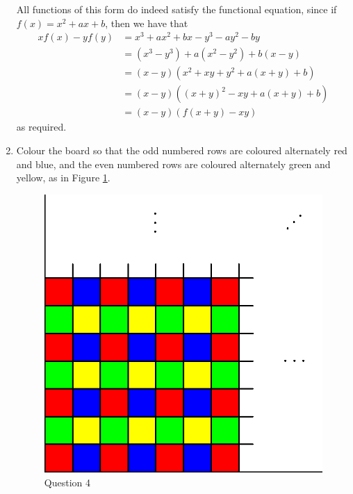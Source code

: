 \documentclass[12pt]{article}
\begin{document}
\begin{enumerate}
All functions of this form do indeed satisfy the functional equation, since if
$f(x) = x^2 + ax + b$, then we have that
\begin{align*}
    xf(x) - yf(y) & = x^3 + ax^2 + bx - y^3 - ay^2 - by \\
    & = (x^3 - y^3) + a(x^2 - y^2) + b(x - y) \\
    & = (x - y)(x^2 + xy + y^2 + a(x + y) + b) \\
    & = (x - y)((x + y)^2 - xy + a(x + y) + b) \\
    & = (x - y)(f(x + y) - xy)
\end{align*}
as required.


\item %

Colour the board so that the odd numbered rows are coloured alternately red
and blue, and the even numbered rows are coloured alternately green and yellow,
as in Figure \ref{fig:q4}.

\begin{figure} \centering
    \includegraphics{january_q4.eps}
    \caption{Question 4}
    \label{fig:q4}
\end{figure}


\end{enumerate}
\end{document}
